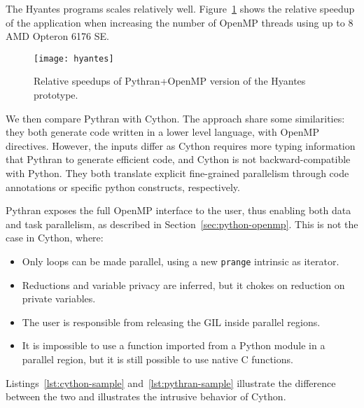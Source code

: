 \documentclass{llncs}
\begin{document}
The Hyantes programs scales relatively well. Figure~\ref{fig:hyantes-speedup} shows
the relative speedup of the application when increasing the number of OpenMP
threads using up to 8 AMD Opteron 6176 SE.

\begin{figure}[ht]
    \caption{Relative speedups of Pythran+OpenMP version of the Hyantes prototype.}
    \label{fig:hyantes-speedup}
    \centering
    \texttt{[image: hyantes]}
\end{figure}

We then compare Pythran with Cython. The approach share some similarities: they
both generate code written in a lower level language, with OpenMP
directives. However, the inputs differ as Cython requires more typing
information that Pythran to generate efficient code, and Cython is not
backward-compatible with Python. They both translate explicit fine-grained
parallelism through code annotations or specific python constructs,
respectively.

Pythran exposes the full OpenMP interface to the user, thus enabling both data
and task parallelism, as described in Section~\ref{sec:python-openmp}. This is
not the case in Cython, where:
%
\begin{itemize}

    \item Only loops can be made parallel, using a new \texttt{prange} intrinsic
        as iterator.

    \item Reductions and variable privacy are inferred, but it chokes on
        reduction on private variables.

    \item The user is responsible from releasing the GIL inside parallel
        regions.

    \item It is impossible to use a function imported from a Python module in a
        parallel region, but it is still possible to use native C functions.

\end{itemize}
%
Listings~\ref{lst:cython-sample} and~\ref{lst:pythran-sample} illustrate the
difference between the two and illustrates the intrusive behavior of Cython.
\end{document}
